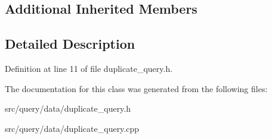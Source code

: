 \subsection*{Additional Inherited Members}


\subsection{Detailed Description}


Definition at line 11 of file duplicate\+\_\+query.\+h.



The documentation for this class was generated from the following files\+:\begin{DoxyCompactItemize}
\item 
src/query/data/duplicate\+\_\+query.\+h\item 
src/query/data/duplicate\+\_\+query.\+cpp\end{DoxyCompactItemize}
